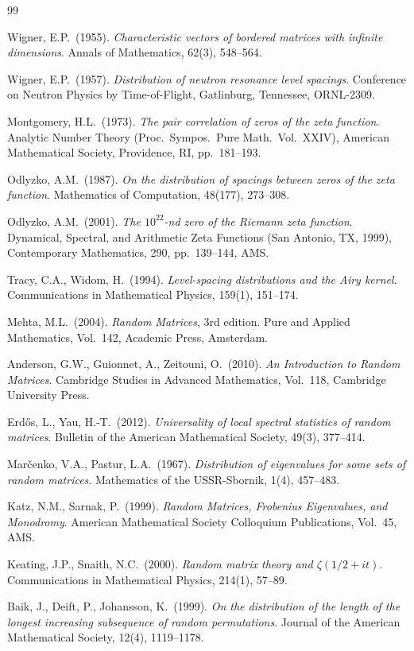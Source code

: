 \documentclass[12pt,a4paper]{amsart}
\theoremstyle{definition}
\theoremstyle{remark}
\begin{document}
\begin{thebibliography}{99}

Wigner, E.P.\ (1955).
\textit{Characteristic vectors of bordered matrices with infinite dimensions}.
Annals of Mathematics, 62(3), 548--564.

Wigner, E.P.\ (1957).
\textit{Distribution of neutron resonance level spacings}.
Conference on Neutron Physics by Time-of-Flight, Gatlinburg, Tennessee,
ORNL-2309.

Montgomery, H.L.\ (1973).
\textit{The pair correlation of zeros of the zeta function}.
Analytic Number Theory (Proc.\ Sympos.\ Pure Math.\ Vol.\ XXIV),
American Mathematical Society, Providence, RI, pp.\ 181--193.

Odlyzko, A.M.\ (1987).
\textit{On the distribution of spacings between zeros of the zeta function}.
Mathematics of Computation, 48(177), 273--308.

Odlyzko, A.M.\ (2001).
\textit{The $10^{22}$-nd zero of the Riemann zeta function}.
Dynamical, Spectral, and Arithmetic Zeta Functions (San Antonio, TX, 1999),
Contemporary Mathematics, 290, pp.\ 139--144, AMS.

Tracy, C.A., Widom, H.\ (1994).
\textit{Level-spacing distributions and the Airy kernel}.
Communications in Mathematical Physics, 159(1), 151--174.

Mehta, M.L.\ (2004).
\textit{Random Matrices}, 3rd edition.
Pure and Applied Mathematics, Vol.\ 142, Academic Press, Amsterdam.

Anderson, G.W., Guionnet, A., Zeitouni, O.\ (2010).
\textit{An Introduction to Random Matrices}.
Cambridge Studies in Advanced Mathematics, Vol.\ 118,
Cambridge University Press.

Erd\H{o}s, L., Yau, H.-T.\ (2012).
\textit{Universality of local spectral statistics of random matrices}.
Bulletin of the American Mathematical Society, 49(3), 377--414.

Mar\v{c}enko, V.A., Pastur, L.A.\ (1967).
\textit{Distribution of eigenvalues for some sets of random matrices}.
Mathematics of the USSR-Sbornik, 1(4), 457--483.

Katz, N.M., Sarnak, P.\ (1999).
\textit{Random Matrices, Frobenius Eigenvalues, and Monodromy}.
American Mathematical Society Colloquium Publications, Vol.\ 45, AMS.

Keating, J.P., Snaith, N.C.\ (2000).
\textit{Random matrix theory and $\zeta(1/2+it)$}.
Communications in Mathematical Physics, 214(1), 57--89.

Baik, J., Deift, P., Johansson, K.\ (1999).
\textit{On the distribution of the length of the longest increasing subsequence
of random permutations}.
Journal of the American Mathematical Society, 12(4), 1119--1178.

\end{thebibliography}
\end{document}
